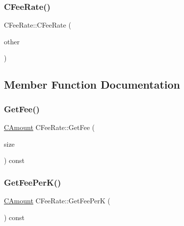 \mbox{\label{class_c_fee_rate_aa82ca8ba290a1c02ed522aacfb5105ef}} 
\subsubsection{\texorpdfstring{C\+Fee\+Rate()}{CFeeRate()}\hspace{0.1cm}{\footnotesize\ttfamily [4/4]}}
{\footnotesize\ttfamily C\+Fee\+Rate\+::\+C\+Fee\+Rate (\begin{DoxyParamCaption}\item[{const \mbox{\hyperlink{class_c_fee_rate}{C\+Fee\+Rate}} \&}]{other }\end{DoxyParamCaption})\hspace{0.3cm}{\ttfamily [inline]}}



\subsection{Member Function Documentation}
\mbox{\label{class_c_fee_rate_a6a3aef64120ef51ac921318282404b0e}} 
\subsubsection{\texorpdfstring{Get\+Fee()}{GetFee()}}
{\footnotesize\ttfamily \mbox{\hyperlink{amount_8h_a4eaf3a5239714d8c45b851527f7cb564}{C\+Amount}} C\+Fee\+Rate\+::\+Get\+Fee (\begin{DoxyParamCaption}\item[{size\+\_\+t}]{size }\end{DoxyParamCaption}) const}

\mbox{\label{class_c_fee_rate_ac772be79983433d442d6b871d2fb6e11}} 
\subsubsection{\texorpdfstring{Get\+Fee\+Per\+K()}{GetFeePerK()}}
{\footnotesize\ttfamily \mbox{\hyperlink{amount_8h_a4eaf3a5239714d8c45b851527f7cb564}{C\+Amount}} C\+Fee\+Rate\+::\+Get\+Fee\+PerK (\begin{DoxyParamCaption}{ }\end{DoxyParamCaption}) const\hspace{0.3cm}{\ttfamily [inline]}}


